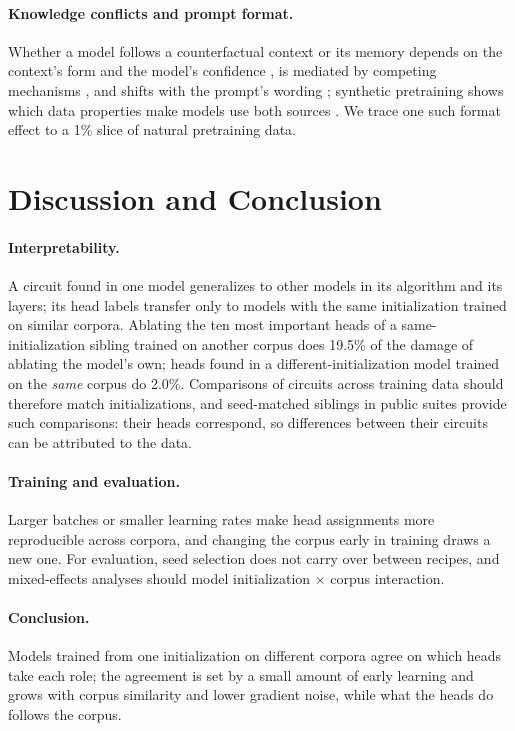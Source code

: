 \documentclass[11pt]{article}
\begin{document}
\paragraph{Knowledge conflicts and prompt format.}
Whether a model follows a counterfactual context or its memory depends on the context's form and the model's confidence \citep{longpre2021entity,xie2024adaptive,du2024context}, is mediated by competing mechanisms \citep{ortu2024competition}, and shifts with the prompt's wording \citep{zhou2023context,sclar2024quantifying,hua2025flaw,liu2026prompt}; synthetic pretraining shows which data properties make models use both sources \citep{kim2026training}.
We trace one such format effect to a 1\% slice of natural pretraining data.

\section{Discussion and Conclusion}
\label{sec:conclusion}

\paragraph{Interpretability.}
A circuit found in one model generalizes to other models in its algorithm and its layers; its head labels transfer only to models with the same initialization trained on similar corpora.
Ablating the ten most important heads of a same-initialization sibling trained on another corpus does 19.5\% of the damage of ablating the model's own; heads found in a different-initialization model trained on the \emph{same} corpus do 2.0\%.
Comparisons of circuits across training data should therefore match initializations, and seed-matched siblings in public suites provide such comparisons: their heads correspond, so differences between their circuits can be attributed to the data.

\paragraph{Training and evaluation.}
Larger batches or smaller learning rates make head assignments more reproducible across corpora, and changing the corpus early in training draws a new one.
For evaluation, seed selection does not carry over between recipes, and mixed-effects analyses should model initialization $\times$ corpus interaction.

\paragraph{Conclusion.}
Models trained from one initialization on different corpora agree on which heads take each role; the agreement is set by a small amount of early learning and grows with corpus similarity and lower gradient noise, while what the heads do follows the corpus.
\end{document}
